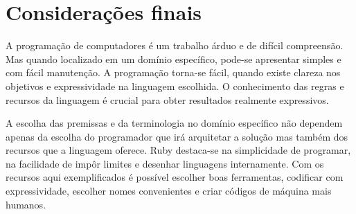 \documentclass[espaco=simples,appendix=Name]{abnt}
\begin{document}
\chapter {Considerações finais}

A programação de computadores é um trabalho árduo e de difícil compreensão. Mas quando localizado em um domínio específico, pode-se apresentar simples e com fácil manutenção. A programação torna-se fácil, quando existe clareza nos objetivos e expressividade na linguagem escolhida. O conhecimento das regras e recursos da linguagem é crucial para obter resultados realmente expressivos. 

A escolha das premissas e da terminologia no domínio específico não dependem apenas da escolha do programador que irá arquitetar a solução mas também dos recursos que a linguagem oferece. Ruby destaca-se na simplicidade de programar, na facilidade de impôr limites e desenhar linguagens internamente. Com os recursos aqui exemplificados é possível escolher boas ferramentas, codificar com expressividade, escolher nomes convenientes e criar códigos de máquina mais humanos.
\end{document}
